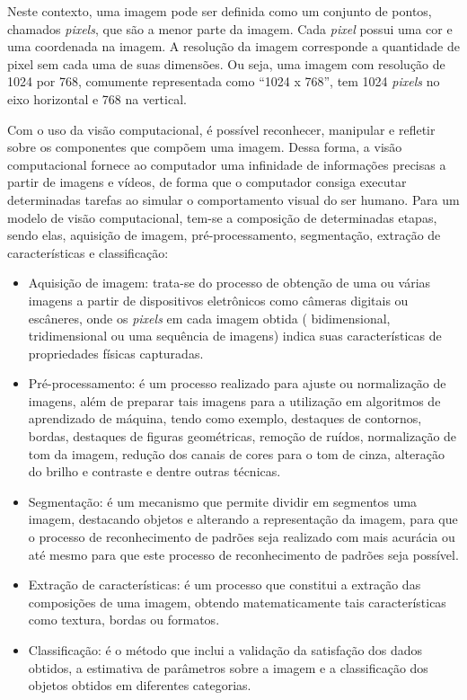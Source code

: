 \documentclass[
	12pt,				%
	oneside,			%
	a4paper,			%
	english,			%
	brazil				%
	]{abntex2ppgsi}
\begin{document}
Neste contexto, uma imagem pode ser definida como um conjunto de pontos, chamados \textit{pixels}, que são a menor parte da imagem. Cada \textit{pixel} possui uma cor e uma coordenada na imagem. A resolução da imagem corresponde a quantidade de pixel sem cada uma de suas dimensões. Ou seja, uma imagem com resolução de 1024 por 768, comumente representada como “1024 x 768”, tem 1024 \textit{pixels} no eixo horizontal e 768 na vertical.

Com o uso da visão computacional, é possível reconhecer, manipular e refletir sobre os componentes que compõem uma imagem. Dessa forma, a visão computacional fornece ao computador uma infinidade de informações precisas a partir de imagens e vídeos, de forma que o computador consiga executar determinadas tarefas ao simular o comportamento visual do ser humano. Para um modelo de visão computacional, tem-se a composição de determinadas etapas, sendo elas, aquisição de imagem, pré-processamento, segmentação, extração de características e classificação:

\begin{itemize}
  \item Aquisição de imagem: trata-se do processo de obtenção de uma ou várias imagens a partir de dispositivos eletrônicos como câmeras digitais ou escâneres, onde os \textit{pixels} em cada imagem obtida ( bidimensional, tridimensional ou uma sequência de imagens) indica suas características de propriedades físicas capturadas.
  \item Pré-processamento: é um processo realizado para ajuste ou normalização de imagens, além de preparar tais imagens para a utilização em algoritmos de aprendizado de máquina, tendo como exemplo, destaques de contornos, bordas, destaques de figuras geométricas, remoção de ruídos, normalização de tom da imagem, redução dos canais de cores para o tom de cinza, alteração do brilho e contraste e dentre outras técnicas.
  \item Segmentação: é um mecanismo que permite dividir em segmentos uma imagem, destacando objetos e alterando a representação da imagem, para que o processo de reconhecimento de padrões seja realizado com mais acurácia ou até mesmo para que este processo de reconhecimento de padrões seja possível.
  \item Extração de características: é um processo que constitui a extração das composições de uma imagem, obtendo matematicamente tais características como textura, bordas ou formatos.
  \item Classificação: é o método que inclui a validação da satisfação dos dados obtidos, a estimativa de parâmetros sobre a imagem e a classificação dos objetos obtidos em diferentes categorias.
\end{itemize}
\end{document}
